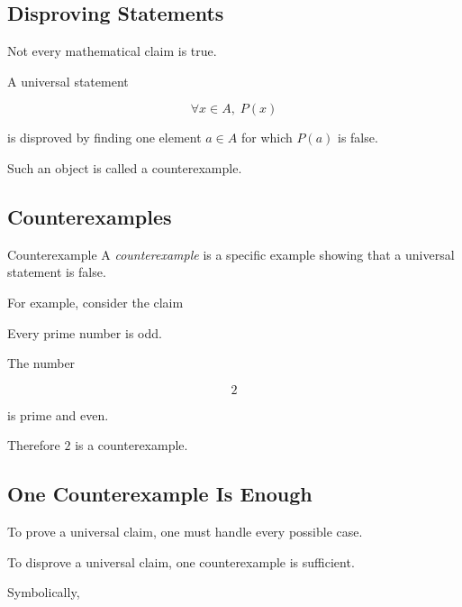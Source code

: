 \subsection{Disproving Statements}
\label{subsec:disproving-statements}

Not every mathematical claim is true.

A universal statement

\[ \forall x\in A,\;P(x) \]

is disproved by finding one element \(a\in A\) for which \(P(a)\) is false.

Such an object is called a counterexample.

\subsection{Counterexamples}
\label{subsec:proof-counterexamples}

\begin{definitionbox}{Counterexample}
A \emph{counterexample} is a specific example showing that a universal
statement is false.
\end{definitionbox}

For example, consider the claim

\begin{center}
Every prime number is odd.
\end{center}

The number

\[ 2 \]

is prime and even.

Therefore \(2\) is a counterexample.

\subsection{One Counterexample Is Enough}
\label{subsec:one-counterexample}

To prove a universal claim, one must handle every possible case.

To disprove a universal claim, one counterexample is sufficient.

Symbolically,

